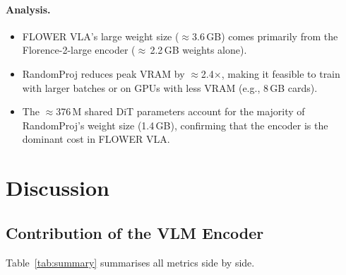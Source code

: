 \documentclass[11pt,a4paper]{article}
\begin{document}
\paragraph{Analysis.}
\begin{itemize}
  \item FLOWER VLA's large weight size ($\approx$3.6\,GB) comes primarily from
        the Florence-2-large encoder ($\approx$\,2.2\,GB weights alone).
  \item RandomProj reduces peak VRAM by $\approx$2.4$\times$,
        making it feasible to train with larger batches or on GPUs with less
        VRAM (e.g., 8\,GB cards).
  \item The $\approx$376\,M shared DiT parameters account for the majority of
        RandomProj's weight size (1.4\,GB), confirming that the encoder is the
        dominant cost in FLOWER VLA.
\end{itemize}

\section{Discussion}
\label{sec:discussion}

\subsection{Contribution of the VLM Encoder}

Table~\ref{tab:summary} summarises all metrics side by side.
\end{document}
